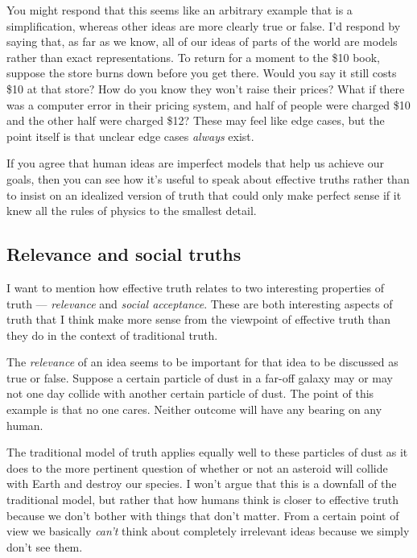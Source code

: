 \documentclass[20pt,]{extarticle}
\begin{document}
You might respond that this seems like an arbitrary example that is a
simplification, whereas other ideas are more clearly true or false. I'd
respond by saying that, as far as we know, all of our ideas of parts of
the world are models rather than exact representations. To return for a
moment to the \$10 book, suppose the store burns down before you get
there. Would you say it still costs \$10 at that store? How do you know
they won't raise their prices? What if there was a computer error in
their pricing system, and half of people were charged \$10 and the other
half were charged \$12? These may feel like edge cases, but the point
itself is that unclear edge cases \emph{always} exist.

If you agree that human ideas are imperfect models that help us achieve
our goals, then you can see how it's useful to speak about effective
truths rather than to insist on an idealized version of truth that could
only make perfect sense if it knew all the rules of physics to the
smallest detail.

\subsection{Relevance and social
truths}\label{relevance-and-social-truths}

I want to mention how effective truth relates to two interesting
properties of truth --- \emph{relevance} and \emph{social acceptance}.
These are both interesting aspects of truth that I think make more sense
from the viewpoint of effective truth than they do in the context of
traditional truth.

The \emph{relevance} of an idea seems to be important for that idea to
be discussed as true or false. Suppose a certain particle of dust in a
far-off galaxy may or may not one day collide with another certain
particle of dust. The point of this example is that no one cares.
Neither outcome will have any bearing on any human.

The traditional model of truth applies equally well to these particles
of dust as it does to the more pertinent question of whether or not an
asteroid will collide with Earth and destroy our species. I won't argue
that this is a downfall of the traditional model, but rather that how
humans think is closer to effective truth because we don't bother with
things that don't matter. From a certain point of view we basically
\emph{can't} think about completely irrelevant ideas because we simply
don't see them.
\end{document}
